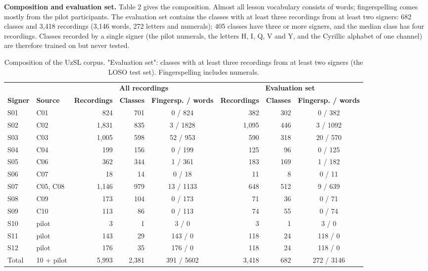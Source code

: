 \documentclass[a4paper,fleqn]{cas-dc}
\begin{document}
\textbf{Composition and evaluation set.} Table 2 gives the composition. Almost all lesson vocabulary consists of words; fingerspelling comes mostly from the pilot participants. The evaluation set contains the classes with at least three recordings from at least two signers: 682 classes and 3,418 recordings (3,146 words, 272 letters and numerals); 405 classes have three or more signers, and the median class has four recordings. Classes recorded by a single signer (the pilot numerals, the letters H, I, Q, V and Y, and the Cyrillic alphabet of one channel) are therefore trained on but never tested.

\begin{table}[t]
\caption{Composition of the UzSL corpus. "Evaluation set": classes with at least three recordings from at least two signers (the LOSO test set). Fingerspelling includes numerals.}\label{tab:corpus}
\footnotesize\setlength{\tabcolsep}{4pt}
\centering
\begin{tabular}{llrrcrrc}
\toprule
& & \multicolumn{3}{c}{\textbf{All recordings}} & \multicolumn{3}{c}{\textbf{Evaluation set}} \\ \cmidrule(lr){3-5}\cmidrule(lr){6-8}
\textbf{Signer} & \textbf{Source} & \textbf{Recordings} & \textbf{Classes} & \textbf{Fingersp. / words} & \textbf{Recordings} & \textbf{Classes} & \textbf{Fingersp. / words} \\
\midrule
S01 & C01 & 824 & 701 & 0 / 824 & 382 & 302 & 0 / 382 \\
S02 & C02 & 1,831 & 835 & 3 / 1828 & 1,095 & 446 & 3 / 1092 \\
S03 & C03 & 1,005 & 598 & 52 / 953 & 590 & 318 & 20 / 570 \\
S04 & C04 & 199 & 156 & 0 / 199 & 125 & 96 & 0 / 125 \\
S05 & C06 & 362 & 344 & 1 / 361 & 183 & 169 & 1 / 182 \\
S06 & C07 & 18 & 14 & 0 / 18 & 11 & 8 & 0 / 11 \\
S07 & C05, C08 & 1,146 & 979 & 13 / 1133 & 648 & 512 & 9 / 639 \\
S08 & C09 & 173 & 104 & 0 / 173 & 71 & 36 & 0 / 71 \\
S09 & C10 & 113 & 86 & 0 / 113 & 74 & 55 & 0 / 74 \\
S10 & pilot & 3 & 1 & 3 / 0 & 3 & 1 & 3 / 0 \\
S11 & pilot & 143 & 29 & 143 / 0 & 118 & 24 & 118 / 0 \\
S12 & pilot & 176 & 35 & 176 / 0 & 118 & 24 & 118 / 0 \\
Total & 10 + pilot & 5,993 & 2,381 & 391 / 5602 & 3,418 & 682 & 272 / 3146 \\
\bottomrule
\end{tabular}
\end{table}
\end{document}
